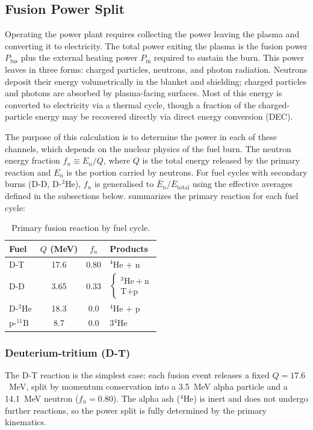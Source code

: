 \documentclass{article}
\begin{document}
\subsection{Fusion Power Split}

Operating the power plant requires collecting the power leaving the
plasma and converting it to electricity. The total power exiting the
plasma is the fusion power $P_{\text{fus}}$ plus the external heating
power $P_{\text{in}}$ required to sustain the burn. This power leaves
in three forms: charged particles, neutrons, and photon
radiation. Neutrons deposit their energy volumetrically in the blanket
and shielding; charged particles and photons are absorbed by
plasma-facing surfaces. Most of this energy is converted to electricity
via a thermal cycle, though a fraction of the charged-particle energy
may be recovered directly via direct energy conversion (DEC).

The purpose of this calculation is to determine the power in each of
these channels, which depends on the nuclear physics of the fuel burn.
The neutron energy fraction
$f_n \equiv E_n / Q$, where $Q$ is the total energy released by the
primary reaction and $E_n$ is the portion carried by neutrons.
For fuel cycles with secondary burns (D-D, D-${}^3$He), $f_n$ is
generalised to $\bar{E}_n / \bar{E}_{\text{total}}$ using the
effective averages defined in the subsections below.
 summarizes the primary reaction
for each fuel cycle:

\begin{table}[htbp]
\caption{Primary fusion reaction by fuel cycle.}
\label{tab:fusion-reactions}
\centering
\renewcommand{\arraystretch}{1.3}
\begin{tabular}{lccl}
\toprule
Fuel & $Q$ (MeV) & $f_n$ & Products \\
\midrule
D-T           & 17.6  & 0.80 & ${}^4$He + n \\
D-D           & 3.65  & 0.33 & $\begin{cases} {}^3\text{He} + \text{n} \\ \text{T} + \text{p} \end{cases}$ \\
D-${}^3$He    & 18.3  & 0.0  & ${}^4$He + p \\
p-${}^{11}$B  & 8.7   & 0.0  & 3${}^4$He \\
\bottomrule
\end{tabular}
\end{table}

\subsubsection{Deuterium-tritium (D-T)}
The D-T reaction is the simplest case: each fusion event releases a
fixed $Q = 17.6$~MeV, split by momentum conservation into a 3.5~MeV
alpha particle and a 14.1~MeV neutron ($f_n = 0.80$). The alpha ash
(${}^4$He) is inert and does not undergo further reactions, so the
power split is fully determined by the primary kinematics.
\end{document}
